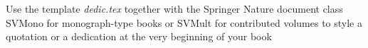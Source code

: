 %
%
%

\begin{dedication}
Use the template \emph{dedic.tex} together with the Springer Nature document class SVMono for monograph-type books or SVMult for contributed volumes to style a quotation or a dedication at the very beginning of your book
\end{dedication}



